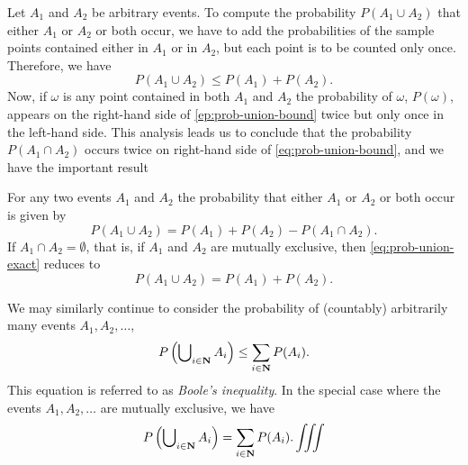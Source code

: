 Let \(A_1\) and \(A_2\) be arbitrary events. To compute the probability
\(P(A_1\cup A_2)\) that either \(A_1\) or \(A_2\) or both occur, we have to
add the probabilities of the sample points contained either in \(A_1\) or
in \(A_2\), but each point is to be counted only once. Therefore, we have
\begin{equation}
  \label{eq:prob-union-bound}
  P(A_1\cup A_2)\leq P(A_1)+P(A_2).
\end{equation}
Now, if \(\omega\) is any point contained in both \(A_1\) and \(A_2\) the
probability of \(\omega\), \(P(\omega)\), appears on the right-hand side of
\eqref{ep:prob-union-bound} twice but only once in the left-hand side. This
analysis leads us to conclude that the probability \(P(A_1\cap A_2)\)
occurs twice on right-hand side of \eqref{eq:prob-union-bound}, and we have
the important result
\begin{theorem}
  For any two events \(A_1\) and \(A_2\) the probability that either
  \(A_1\) or \(A_2\) or both occur is given by
  \begin{equation}
    \label{eq:prob-union-exact}
    P(A_1\cup A_2)=P(A_1)+P(A_2)-P(A_1\cap A_2).
  \end{equation}
  If \(A_1\cap A_2=\emptyset\), that is, if \(A_1\) and \(A_2\) are
  mutually exclusive, then \eqref{eq:prob-union-exact} reduces to
  \[
    P(A_1\cup A_2)=P(A_1)+P(A_2).
  \]
\end{theorem}

We may similarly continue to consider the probability of (countably)
arbitrarily many events \(A_1,A_2,\dotsc\),
\begin{equation}
  \label{eq:booles-inequality}
  P\left(\bigcup\nolimits_{i\in\mathbf{N}} A_i\right)\leq\sum_{i\in\mathbf{N}} P(A_i).
\end{equation}
This equation is referred to as \emph{Boole's inequality}. In the special
case where the events \(A_1,A_2,\dotsc\) are mutually exclusive, we have
\[
  P\left( \bigcup\nolimits_{i\in\mathbf{N}} A_i\right)=\sum_{i\in\mathbf{N}} P(A_i).
  \iiint
\]

